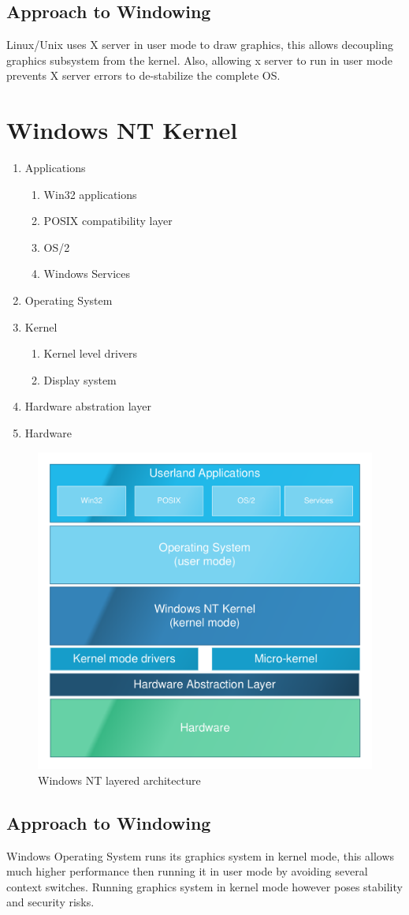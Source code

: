 \documentclass[a4,11pt]{article}
\begin{document}
\subsection{Approach to Windowing}
Linux/Unix uses X server in user mode to draw graphics, this allows
decoupling graphics subsystem from the kernel. Also, allowing x server
to run in user mode prevents X server errors to de-stabilize the
complete OS.
\section{Windows NT Kernel}

\begin{enumerate}
\item Applications
  \begin{enumerate}
  \item Win32 applications
  \item POSIX compatibility layer
  \item OS/2
  \item Windows Services
  \end{enumerate}
\item Operating System
\item Kernel
  \begin{enumerate}
  \item Kernel level drivers
  \item Display system
  \end{enumerate}
\item Hardware abstration layer
\item Hardware
\end{enumerate}

\begin{figure}[!ht]
  \centering
  \includegraphics[width=0.5\linewidth]{images/win-nt-layers.pdf}
  \caption{Windows NT layered architecture}
  \label{fig:win-nt-layered}
\end{figure}

\subsection{Approach to Windowing}
Windows Operating System runs its graphics system in kernel mode, this
allows much higher performance then running it in user mode by
avoiding several context switches. Running graphics system in kernel
mode however poses stability and security risks.
\end{document}
